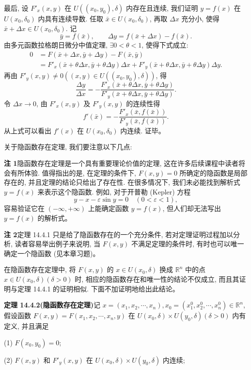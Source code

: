 \documentclass[UTF8,12pt,a4paper,fontset=fandol]{ctexart}
\begin{document}
最后, 设 $F'_x(x,y)$ 在 $U((x_0,y_0),\delta)$ 内存在且连续, 我们证明 $y=f(x)$ 在 $U(x_0,\delta_0)$ 内具有连续导数. 任取 $\bar x\in U(x_0,\delta_0)$, 再取 $\Delta x$ 充分小, 使得 $\bar x+\Delta x\in U(x_0,\delta_0)$. 记
\[
  \bar y=f(\bar x),\qquad
  \Delta y=f(\bar x+\Delta x)-f(\bar x).
\]
由多元函数拉格朗日微分中值定理, $\exists0<\theta<1$, 使得下式成立:
\[
\begin{aligned}
  0&=F(\bar x+\Delta x,\bar y+\Delta y)-F(\bar x,\bar y)\\
  &=F'_x(\bar x+\theta\Delta x,\bar y+\theta\Delta y)\Delta x
  +F'_y(\bar x+\theta\Delta x,\bar y+\theta\Delta y)\Delta y.
\end{aligned}
\]
再由 $F'_y(x,y)\ne0((x,y)\in U((x_0,y_0),\delta))$, 得
\[
  \frac{\Delta y}{\Delta x}
  =-\frac{F'_x(\bar x+\theta\Delta x,\bar y+\theta\Delta y)}
  {F'_y(\bar x+\theta\Delta x,\bar y+\theta\Delta y)}.
\]
令 $\Delta x\to0$, 由 $F'_x(x,y)$ 及 $F'_y(x,y)$ 的连续性得
\[
  f'(\bar x)=-\frac{F'_x(\bar x,f(\bar x))}{F'_y(\bar x,f(\bar x))}.
\]
从上式可以看出 $f'(x)$ 在 $U(x_0,\delta_0)$ 内连续. 证毕。

关于隐函数存在定理, 我们要注意以下几点:

\noindent\textbf{注 1}\quad 隐函数存在定理是一个具有重要理论价值的定理, 这在许多后续课程中读者将会有所体验. 值得指出的是, 在定理的条件下, $F(x,y)=0$ 所确定的隐函数是局部存在的, 并且定理的结论只给出了存在性. 在很多情况下, 我们未必能找到解析式 $y=f(x)$ 来表示这个隐函数. 例如, 对于开普勒 (Kepler) 方程
\[
  y-x-\varepsilon\sin y=0\quad(0<\varepsilon<1),
\]
容易验证它在 $(-\infty,+\infty)$ 上能确定函数 $y=f(x)$, 但人们却无法写出 $y=f(x)$ 的解析式。

\noindent\textbf{注 2}\quad 定理 14.4.1 只是给了隐函数存在的一个充分条件, 若对定理证明过程加以分析, 读者容易举出例子来说明, 当 $F(x,y)$ 不满足定理的条件时, 有时也可以唯一确定一个隐函数 (见本章习题)。

在隐函数存在定理中, 将 $F(x,y)$ 的 $x\in U(x_0,\delta)$ 换成 $\mathbb R^n$ 中的点 $x\in U(x_0,\delta)(\delta>0)$ 时, 相应的隐函数存在和唯一性的结论不仅成立, 而且其证明与定理 14.4.1 的证明相似. 下面不加证明地给出此结论。

\noindent\textbf{定理 14.4.2(隐函数存在定理)}\quad 记 $x=(x_1,x_2,\cdots,x_n),x_0=(x_1^0,x_2^0,\cdots,x_n^0)\in\mathbb R^n$, 假设函数 $F(x,y)=F(x_1,x_2,\cdots,x_n,y)$ 在 $U(x_0,\delta)\times U(y_0,\delta)(\delta>0)$ 内有定义, 并且满足

(1) $F(x_0,y_0)=0$;

(2) $F(x,y)$ 和 $F'_y(x,y)$ 在 $U(x_0,\delta)\times U(y_0,\delta)$ 内连续;
\end{document}
